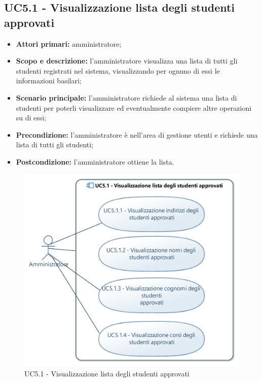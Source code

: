 \documentclass[AnalisiDeiRequisiti.tex]{subfiles}
\begin{document}
\subsection{UC5.1 - Visualizzazione lista degli studenti approvati}
\begin{itemize}
	\item \textbf{Attori primari:} amministratore;
	\item \textbf{Scopo e descrizione:} l'amministratore visualizza una lista di tutti gli studenti registrati nel sistema, visualizzando per ognuno di essi le informazioni basilari;
	\item \textbf{Scenario principale:} l'amministratore richiede al sistema una lista di studenti per poterli visualizzare ed eventualmente compiere altre operazioni su di essi;
	\item \textbf{Precondizione:} l'amministratore è nell'area di gestione utenti e richiede una lista di tutti gli studenti; 
	\item \textbf{Postcondizione:} l'amministratore ottiene la lista.
\end{itemize}
\begin{figure}[H]
	\centering
	\includegraphics[width=0.9\linewidth]{UC5_1.jpg}
	\caption{UC5.1 - Visualizzazione lista degli studenti approvati}
	\label{fig:UC5.1 - Visualizzazione lista degli studenti approvati}
\end{figure}
\end{document}
